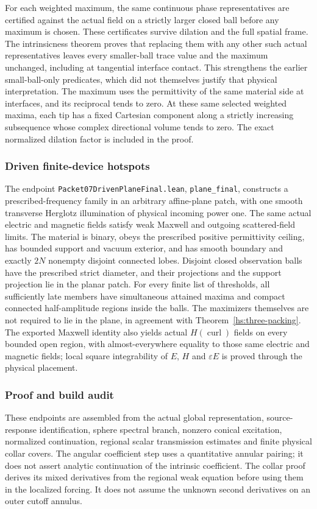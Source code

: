 For each weighted maximum, the same continuous phase representatives
are certified against the actual field on a strictly larger closed ball
before any maximum is chosen. These certificates survive dilation and
the full spatial frame. The intrinsicness theorem proves that replacing
them with any other such actual representatives leaves every smaller-ball
trace value and the maximum unchanged, including at tangential interface
contact. This strengthens the earlier small-ball-only predicates, which
did not themselves justify that physical interpretation. The maximum
uses the permittivity of the same material side at interfaces, and its
reciprocal tends to zero. At these same selected weighted maxima, each
tip has a fixed Cartesian component along a strictly increasing
subsequence whose complex directional volume tends to zero. The exact
normalized dilation factor is included in the proof.

\subsubsection*{Driven finite-device hotspots}
The endpoint \texttt{Packet07DrivenPlaneFinal.lean},
\texttt{plane\_final}, constructs a prescribed-frequency
family in an arbitrary affine-plane patch, with one smooth transverse Herglotz illumination of physical
incoming power one.  The same actual electric and magnetic fields
satisfy weak Maxwell and outgoing scattered-field limits.  The material
is binary, obeys the prescribed positive permittivity ceiling, has
bounded support and vacuum exterior, and has smooth boundary and
exactly $2N$ nonempty disjoint connected lobes.  Disjoint closed observation balls have the prescribed
strict diameter, and their projections and the support projection lie
in the planar patch.  For every finite list of thresholds, all
sufficiently late members have simultaneous attained maxima and
compact connected half-amplitude regions inside the balls.  The
maximizers themselves are not required to lie in the plane, in agreement
with Theorem~\ref{hs:three-packing}.
The exported Maxwell identity also yields actual $H(\operatorname{curl})$
fields on every bounded open region, with almost-everywhere equality
to those same electric and magnetic fields; local square integrability
of $E$, $H$ and $\varepsilon E$ is proved through the physical placement.

\subsubsection*{Proof and build audit}
These endpoints are assembled from the actual global representation,
source-response identification, sphere spectral branch, nonzero conical
excitation, normalized continuation, regional scalar transmission
estimates and finite physical collar covers.  The angular coefficient
step uses a quantitative annular pairing; it does not assert analytic
continuation of the intrinsic coefficient.  The collar proof derives
its mixed derivatives from the regional weak equation before using
them in the localized forcing.  It does not assume the unknown second
derivatives on an outer cutoff annulus.


